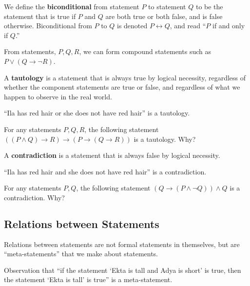 \documentclass[a4paper,english,12pt]{article}
\begin{document}
\begin{defn}[Biconditional] We define the \textbf{biconditional} from statement $P$ to statement $Q$ to be the statement that is true if $P$ and $Q$ are both true or both false, and is false otherwise. Biconditional from $P$ to $Q$ is denoted $P \leftrightarrow Q$, and read ``$P$ if and only if $Q$.'' 
\end{defn}
\begin{exmp} From statements, $P,Q,R$, we can form compound statements such as $P \vee (Q\rightarrow \neg R)$.
\end{exmp}		
\begin{defn}[Tautology] A \textbf{tautology} is a statement that is always true by logical necessity, regardless of whether the component statements are true or false, and regardless of what we happen to observe in the real world. 
\end{defn}	
\begin{exmp} ``Ila has red hair or she does not have red hair'' is a tautology.
\end{exmp}
\begin{exmp} For any statements $P,Q,R$, the following statement $((P \wedge Q)\rightarrow R) \rightarrow (P \rightarrow (Q \rightarrow R))$ is a tautology. Why?
\end{exmp}
\begin{defn}[Contradiction] A \textbf{contradiction} is a statement that is always false by logical necessity.  
\end{defn}
\begin{exmp} ``Ila has red hair and she does not have red hair'' is a contradiction.
\end{exmp}
\begin{exmp} For any statements $P,Q$, the following statement $(Q\rightarrow (P \wedge \neg Q))\wedge Q$ is a contradiction. Why?
\end{exmp}

\subsection{Relations between Statements}
Relations between statements are not formal statements in themselves, but are ``meta-statements'' that we make about statements. 
\begin{exmp} Observation that ``if the statement ‘Ekta is tall and Adya is short’ is true, then the statement ‘Ekta is tall’ is true'' is a meta-statement.
\end{exmp}
\end{document}

